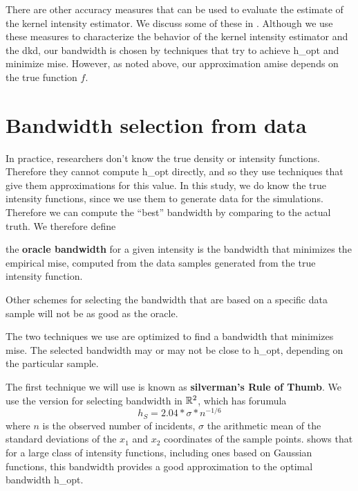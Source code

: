 There are other accuracy measures that can be used to evaluate the estimate of the \gls{kernel intensity estimator}.
We discuss some of these in .
Although we use these measures to characterize the behavior of the \gls{kernel intensity estimator} and the \gls{dkd},
our bandwidth is chosen by techniques that try to achieve \gls{h_opt} and minimize \gls{mise}.
However, as noted above,
our approximation \gls{amise} depends on the true function $f$.


\section{Bandwidth selection from data}
\label{sec:theory:bandwidthselection}

In practice,
researchers don't know the true density or intensity functions.
Therefore they cannot compute \gls{h_opt} directly,
and so they use techniques that give them approximations for this value.
In this study,
we do know the true intensity functions,
since we use them to generate data for the simulations.
Therefore we can compute the ``best'' bandwidth by comparing to the actual truth.
We therefore define
\begin{defn}
    the \textbf{\gls{oracle bandwidth}} for a given \gls{intensity} is the bandwidth that minimizes the empirical \gls{mise},
    computed from the data samples generated from the true \gls{intensity} function.
\end{defn}
Other schemes for selecting the bandwidth that are based on a specific data sample will not be as good as the \gls{oracle}.

The two techniques we use are optimized to find a bandwidth that minimizes \gls{mise}.
The selected bandwidth may or may not be close to \gls{h_opt},
depending on the particular sample.

The first technique we will use is known as \textbf{\Gls{silverman}'s Rule of Thumb}.
We use the version for selecting bandwidth in $\mathbb{R}^2$,
which has forumula
\begin{equation}
    \label{eq:silverman}
    h_S = 2.04 * \sigma * n^{-1/6}%
\end{equation}
where $n$ is the observed number of incidents,
$\sigma$ the arithmetic mean of the standard deviations of the $x_1$ and $x_2$ coordinates of the sample points.
\citet{silverman1986density} shows that for a large class of intensity functions,
including ones based on Gaussian functions,
this bandwidth provides a good approximation to the optimal bandwidth \gls{h_opt}. 

